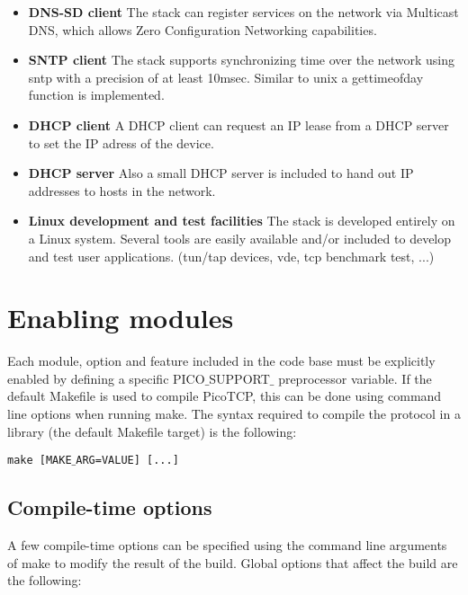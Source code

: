 \begin{itemize}
\item \textbf{DNS-SD client} The stack can register services on the network via Multicast DNS, which allows Zero Configuration Networking capabilities.
\item \textbf{SNTP client} The stack supports synchronizing time over the network using sntp with a precision of at least 10msec. Similar to unix a gettimeofday function is implemented.
\item \textbf{DHCP client} A DHCP client can request an IP lease from a DHCP server to set the IP
					adress of the device.
\item \textbf{DHCP server} Also a small DHCP server is included to hand out IP addresses to hosts
					in the network.
\item \textbf{Linux development and test facilities} The stack is developed entirely on a Linux system.
					Several tools are easily available and/or included to develop and test user applications.
					(tun/tap devices, vde, tcp benchmark test, ...)
\end{itemize}

\section{Enabling modules}
Each module, option and feature included in the code base must be explicitly
enabled by defining a specific PICO$\_$SUPPORT$\_$ preprocessor variable.
If the default Makefile is used to compile PicoTCP, this can be done using
command line options when running make. The syntax required to compile the
protocol in a library (the default Makefile target) is the following:

\texttt{make [MAKE$\_$ARG=VALUE] [...] }

\subsection{Compile-time options}
A few compile-time options can be specified using the command line
arguments of make to modify the result of the build. Global options that
affect the build are the following:

